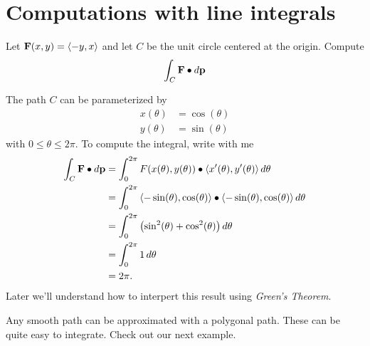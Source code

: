 \documentclass{ximera}
\begin{document}
\section{Computations with line integrals}




\begin{example}
  Let $\mathbf{F}(x,y) = \left\langle -y,x\right\rangle$ and let $C$ be the unit circle
  centered at the origin. Compute
  \[
  \int_C \mathbf{F}\bullet d\mathbf{p}
  \]
  \begin{explanation}
    The path $C$ can be parameterized by
    \begin{align*}
      x(\theta) &= \cos(\theta)\\
      y(\theta) &= \sin(\theta)
    \end{align*}
    with $0\le \theta\le 2\pi$. To compute the integral, write with me
    \begin{align*}
      \int_C \mathbf{F}\bullet d\mathbf{p} &= \int_0^{2\pi} F(x(\theta),y(\theta))\bullet \left\langle x'(\theta),y'(\theta)\right\rangle\mathop{}\!d \theta\\
      &= \int_0^{2\pi} \left\langle -\sin(\theta),\cos(\theta)\right\rangle\bullet \left\langle -\sin(\theta),\cos(\theta)\right\rangle\mathop{}\!d \theta\\
      &= \int_0^{2\pi}\left(\sin^2(\theta)+\cos^2(\theta)\right)\mathop{}\!d \theta\\
      &= \int_0^{2\pi} 1\mathop{}\!d \theta\\
      &=2\pi.
    \end{align*}
    Later we'll understand how to interpert this result using
    \textit{Green's Theorem}.
  \end{explanation}
\end{example}

Any smooth path can be approximated with a polygonal path. These can
be quite easy to integrate. Check out our next example.
\end{document}
